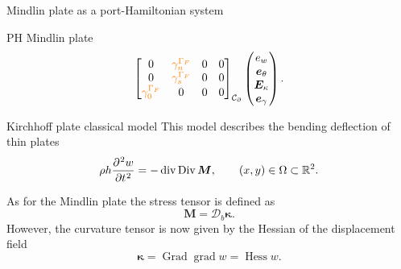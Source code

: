 \documentclass[aspectratio=169]{ISAE-Beamer}
\DeclareMathOperator*{\grad}{grad}
\DeclareMathOperator*{\Grad}{Grad}
\DeclareMathOperator*{\Div}{Div}
\renewcommand{\div}{\operatorname{div}}
\DeclareMathOperator*{\Hess}{Hess}
\newcommand{\bbR}{\mathbb{R}}
\begin{document}
\begin{frame}{Mindlin plate as a port-Hamiltonian system}
\begin{block}{PH Mindlin plate}
\begin{equation*}
\begin{aligned}
{\begin{bmatrix}
			{0} & \textcolor{orange}{\gamma_{n}^{\Gamma_F}} & {0} & {0} \\
			{0} & \textcolor{orange}{\gamma_{s}^{\Gamma_F}} & {0} & {0} \\
			\textcolor{orange}{\gamma_{0}^{\Gamma_F}} & {0} & {0} & {0} \\
			\end{bmatrix}}_{\mathcal{C}_\partial}
		\begin{pmatrix}
		e_w \\
		\bm{e}_{\theta} \\
		\bm{E}_{\kappa} \\
		\bm{e}_{\gamma} \\
		\end{pmatrix}.
		\end{aligned}
		\end{equation*}
	\end{block}
\end{frame}

\begin{frame}{Kirchhoff plate classical model}
	This model describes the bending deflection of thin plates
	\begin{equation*}
	\rho h \diffp[2]{w}{t} = - \div\Div \bm{M}, \qquad (x,y) \in \Omega \subset \bbR^2.
	\end{equation*}

	As for the Mindlin plate the stress tensor is defined as 
	$$\bm{M} = \bm{\mathcal{D}}_b \bm{\kappa}.$$
	However, the curvature tensor is now given by the Hessian of the displacement field
	$$\bm{\kappa} = \Grad\grad w = \Hess w.$$
\end{frame}
\end{document}
